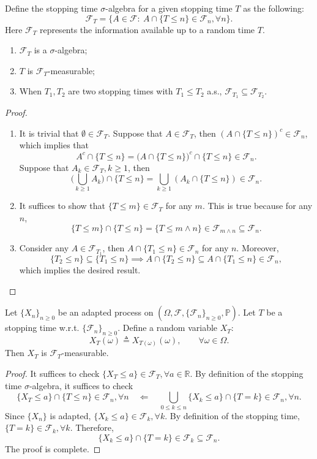 \begin{definition}
Define the stopping time $\sigma$-algebra for a given stopping time $T$ as the following:
\[
\mathcal{F}_T = \{A\in\mathcal{F}:~
A\cap\{T\le n\}\in\mathcal{F}_n,\forall n
\}.
\]
Here $\mathcal{F}_T$ represents the information available up to a random time $T$.
\end{definition}
\begin{proposition}
\begin{enumerate}
\item
$\mathcal{F}_T$ is a $\sigma$-algebra;
\item
$T$ is $\mathcal{F}_T$-measurable;
\item
When $T_1,T_2$ are two stopping times with $T_1\le T_2$ a.s., 
$\mathcal{F}_{T_1}\subseteq\mathcal{F}_{T_2}$.
\end{enumerate}
\end{proposition}
\begin{proof}
\begin{enumerate}
\item
It is trivial that $\emptyset\in\mathcal{F}_T$.
Suppose that $A\in\mathcal{F}_T$, then $(A\cap\{T\le n\})^c\in\mathcal{F}_n$, which implies that
\[
A^c\cap\{T\le n\} = \bigg(
A\cap\{T\le n\}
\bigg)^c\cap\{T\le n\}\in\mathcal{F}_n.
\]
Suppose that $A_k\in\mathcal{F}_T, k\ge1$, then
\[
\bigg(
\bigcup_{k\ge1}A_k
\bigg)\cap\{T\le n\} = \bigcup_{k\ge1}(A_k\cap \{T\le n\})\in\mathcal{F}_n.
\]
\item
It suffices to show that $\{T\le m\}\in\mathcal{F}_T$ for any $m$.
This is true because for any $n$, 
\[
\{T\le m\}\cap\{T\le n\} = \{T\le m\land n\}\in\mathcal{F}_{m\land n}\subseteq\mathcal{F}_n.
\]
\item
Consider any $A\in\mathcal{F}_{T_1}$, then $A\cap\{T_1\le n\}\in\mathcal{F}_n$ for any $n$.
Moreover, 
\[
\{T_2\le n\}\subseteq\{T_1\le n\}\implies
A\cap\{T_2\le n\}\subseteq A\cap\{T_1\le n\}\in\mathcal{F}_n,
\]
which implies the desired result.
\end{enumerate}
\end{proof}
\begin{theorem}
Let $\{X_n\}_{n\ge0}$ be an adapted process on $(\Omega,\mathcal{F},\{\mathcal{F}_n\}_{n\ge0},\mathbb{P})$.
Let $T$ be a stopping time w.r.t. $\{\mathcal{F}_n\}_{n\ge0}$.
Define a random variable $X_T$:
\[
X_T(\omega)\triangleq X_{T(\omega)}(\omega),\qquad\forall\omega\in\Omega.
\]
Then $X_T$ is $\mathcal{F}_T$-measurable.
\end{theorem}
\begin{proof}
It suffices to check $\{X_T\le a\}\in\mathcal{F}_T, \forall a\in\mathbb{R}$. By definition of the stopping time $\sigma$-algebra, it suffices to check
\[
\{X_T\le a\}\cap \{T\le n\}\in\mathcal{F}_n,\forall n\quad
\Longleftarrow
\quad
\bigcup_{0\le k\le n}\{X_k\le a\}\cap \{T=k\}\in\mathcal{F}_n,\forall n.
\]
Since $\{X_n\}$ is adapted, $\{X_k\le a\}\in\mathcal{F}_k,\forall k$.
By definition of the stopping time, $\{T=k\}\in\mathcal{F}_k,\forall k$.
Therefore,
\[
\{X_k\le a\}\cap \{T=k\}\in\mathcal{F}_k\subseteq \mathcal{F}_n.
\]
The proof is complete.
\end{proof}

